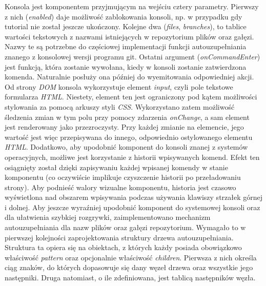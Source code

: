 \documentclass[12pt,a4paper,polish,thesis]{dcsbook}
\begin{document}
{	Konsola jest komponentem przyjmującym na wejściu cztery parametry. Pierwszy z nich (\textit{enabled}) daje możliwość zablokowania konsoli, np. w przypadku gdy tutorial nie został jeszcze ukończony. Kolejne dwa (\textit{files}, \textit{branches}), to tablice wartości tekstowych z nazwami istniejących w repozytorium plików oraz gałęzi. Nazwy te są potrzebne do częściowej implementacji funkcji autouzupełniania znanego z konsolowej wersji programu git. Ostatni argument (\textit{onCommandEnter}) jest funkcją, która zostanie wywołana, kiedy w konsoli zostanie zatwierdzona komenda. Naturalnie posłuży ona później do wyemitowania odpowiedniej akcji.
	Od strony \textit{DOM} konsola wykorzystuje element \textit{input}, czyli pole tekstowe formularza \textit{HTML}. Niestety, element ten jest ograniczony pod kątem możliwości stylowania za pomocą arkuszy styli \textit{CSS}. Wykorzystano zatem możliwość śledzenia zmian w tym polu przy pomocy zdarzenia \textit{onChange}, a sam element jest renderowany jako przezroczysty. Przy każdej zmianie na elemencie, jego wartość jest więc przepisywana do innego, odpowiednio ostylowanego elementu \textit{HTML}.
	Dodatkowo, aby upodobnić komponent do konsoli znanej z systemów operacyjnych, możliwe jest korzystanie z historii wpisywanych komend. Efekt ten osiągnięty został dzięki zapisywaniu każdej wpisanej komendy w stanie komponentu (co oczywiście implikuje czyszczenie historii po przeładowaniu strony). Aby podnieść walory wizualne komponentu, historia jest czasowo wyświetlona nad obszarem wpisywania podczas używania klawiszy strzałek górnej i dolnej.
	Aby jeszcze wyraźniej upodobnić komponent do systemowej konsoli oraz dla ułatwienia szybkiej rozgrywki, zaimplementowano mechanizm autouzupełniania dla nazw plików oraz gałęzi repozytorium. Wymagało to w pierwszej kolejności zaprojektowania struktury drzewa autouzupełniania. Struktura ta opiera się na obiektach, z których każdy posiada obowiązkowo właściwość \textit{pattern} oraz opcjonalnie właściwość \textit{children}. Pierwsza z nich określa ciąg znaków, do których dopasowuje się dany węzeł drzewa oraz wszystkie jego następniki. Druga natomiast, o ile zdefiniowana, jest tablicą następników węzła.
}
\end{document}
